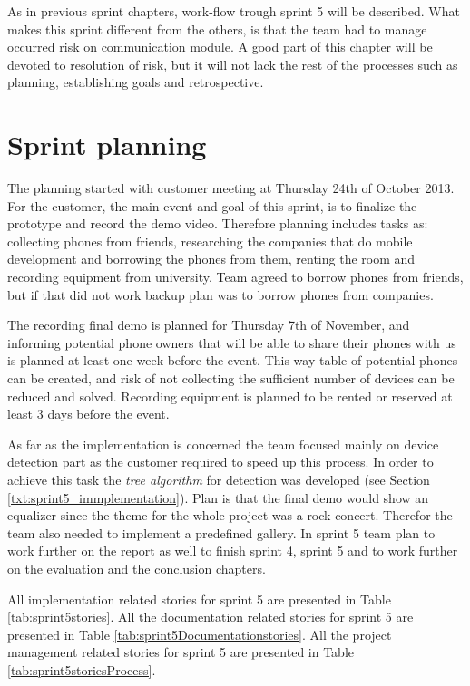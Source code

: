 \label{chap:sprint5}
As in previous sprint chapters, work-flow trough sprint 5 will be described. What makes this sprint different from the others, is that the team had to manage occurred risk on communication module. A good part of this chapter will be devoted to resolution of risk, but it will not lack the rest of the processes such as planning, establishing goals and retrospective.

\section{Sprint planning}

The planning started with customer meeting at Thursday 24th of October 2013. For the customer, the main event and goal of this sprint, is to finalize the prototype and record the demo video. Therefore planning includes tasks as: collecting phones from friends, researching the companies that do mobile development and borrowing the phones from them, renting the room and recording equipment from university. Team agreed to borrow phones from friends, but if that did not work backup plan was to borrow phones from companies.

The recording final demo is planned for Thursday 7th of November, and informing potential phone owners that will be able to share their phones with us is planned at least one week before the event. This way table of potential phones can be created, and risk of not collecting the sufficient number of devices can be reduced and solved. Recording equipment is planned to be rented or reserved at least 3 days before the event.

As far as the implementation is concerned the team focused mainly on device detection part as the customer required to speed up this process. In order to achieve this task the \textit{tree algorithm} for detection was developed (see Section \ref{txt:sprint5_immplementation}). Plan is that the final demo would show an equalizer since the theme for the whole project was a rock concert. Therefor the team also needed to implement a predefined gallery.
In sprint 5 team plan to work further on the report as well to finish sprint 4, sprint 5 and to work further on the evaluation and the conclusion chapters.  

All implementation related stories for sprint 5 are presented in Table \ref{tab:sprint5stories}.
 All the documentation related stories for sprint 5 are presented in Table \ref{tab:sprint5Documentationstories}.
 All the project management related stories for sprint 5 are presented in Table \ref{tab:sprint5storiesProcess}.


